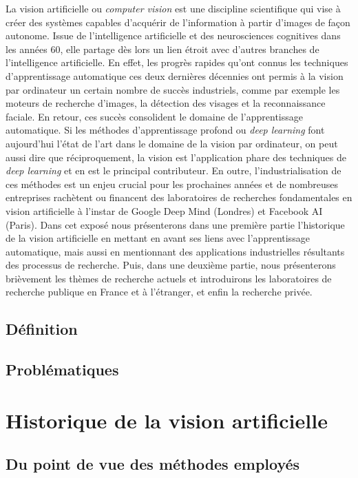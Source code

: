\documentclass{article}
\begin{document}
La vision artificielle ou \textit{computer vision} est une discipline scientifique qui vise à créer des systèmes capables d'acquérir de l'information à partir d'images de façon autonome. Issue de l'intelligence artificielle et des neurosciences cognitives dans les années 60, elle partage dès lors un lien étroit avec d'autres branches de l'intelligence artificielle.
En effet, les progrès rapides qu'ont connus les techniques d'apprentissage automatique ces deux dernières décennies ont permis à la vision par ordinateur un certain nombre de succès industriels, comme par exemple les moteurs de recherche d'images, la détection des visages et la reconnaissance faciale. En retour, ces succès consolident le domaine de l'apprentissage automatique. Si les méthodes d'apprentissage profond ou \textit{deep learning} font aujourd'hui l'état de l'art dans le domaine de la vision par ordinateur, on peut aussi dire que réciproquement, la vision est l'application phare des techniques de \textit{deep learning} et en est le principal contributeur.
En outre, l'industrialisation de ces méthodes est un enjeu crucial pour les prochaines années et de nombreuses entreprises rachètent ou financent des laboratoires de recherches fondamentales en vision artificielle à l'instar de Google Deep Mind (Londres) et Facebook AI (Paris).
Dans cet exposé nous présenterons dans une première partie l'historique de la vision artificielle en mettant en avant ses liens avec l'apprentissage automatique, mais aussi en mentionnant des applications industrielles résultants des processus de recherche. Puis, dans une deuxième partie, nous présenterons brièvement les thèmes de recherche actuels et introduirons les laboratoires de recherche publique en France et à l'étranger, et enfin la recherche privée.

\subsection{Définition}
\subsection{Problématiques}

\section{Historique de la vision artificielle}
\subsection{Du point de vue des méthodes employés}
\end{document}
